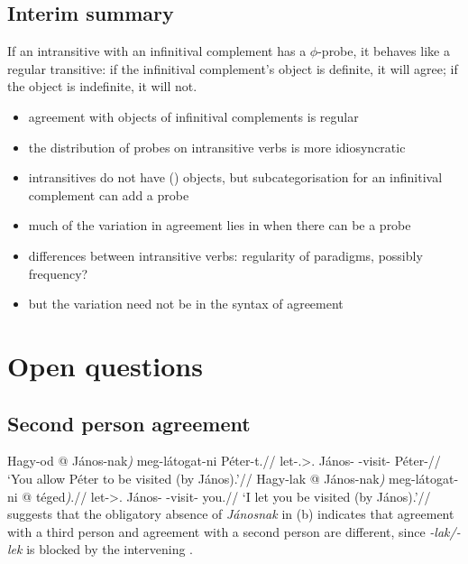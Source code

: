 \subsection{Interim summary}

If an intransitive with an infinitival complement has a $\phi$-probe, it
behaves like a regular transitive: if the infinitival complement's object is
definite, it will agree; if the object is indefinite, it will not.

\begin{itemize}

    \item 	agreement with objects of infinitival complements is regular

    \item 	the distribution of probes on intransitive verbs is more
        idiosyncratic

    \item 	intransitives do not have (\Acc{}) objects, but subcategorisation
        for an infinitival complement can add a probe

    \item[\ding{224}]   much of the variation in agreement lies in when
        there can be a probe

    \item[\ding{224}] 	differences between intransitive verbs: regularity of
        paradigms, possibly frequency?

    \item[\ding{224}]   but the variation need not be in the syntax of
        agreement

\end{itemize}

\section{Open questions}\label{sec:open-questions}

\subsection{Second person agreement}\label{sub:2-agr}

\pex
    \a
    \begingl
        \gla 	Hagy-od \nogloss{(} @ János-nak\emph{)} meg-látogat-ni Péter-t.//
        \glb 	let-\Tsg.\Sbj>\Third.\Obj{} János-\Dat{} \Vm-visit-\Inf{} Péter-\Acc{}//
        \glft 	\enquote*{You allow Péter to be visited (by János).}//
    \endgl
    \a
    \begingl
        \gla 	Hagy-lak \nogloss{(*} @ János-nak\emph{)} meg-látogat-ni \nogloss{(} @ téged\emph{)}.//
        \glb 	let-\Fsg>\Second.\Obj{} János-\Dat{} \Vm-visit-\Inf{} you.\Acc//
        \glft 	\enquote*{I let you be visited (by János).}//
    \endgl
\xe
\Textcite{denDikken2004} suggests that the obligatory absence of
\emph{Jánosnak} in (\lastx b) indicates that agreement with a third person
and agreement with a second person are different, since \emph{-lak/-lek} is
blocked by the intervening \Dat{}.

